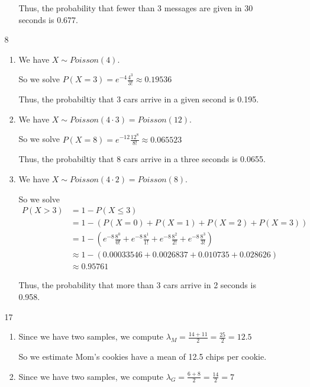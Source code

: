 \documentclass[12pt,letterpaper]{article}
\begin{document}
\begin{enumerate}
\begin{enumerate}
\begin{enumerate}[label=(\arabic*)]
              Thus, the probability that fewer than 3 messages are given in 30 seconds is 0.677.
          \end{enumerate}
        \item [8]
          \begin{enumerate}[label=(\arabic*)]
            \item
              We have $X \sim Poisson(4)$.

              So we solve $P(X = 3) = e^{-4}\frac{4^3}{3!} \approx 0.19536$

              Thus, the probabiltiy that 3 cars arrive in a given second is 0.195.
            \item
              We have $X \sim Poisson(4 \cdot 3) = Poisson(12)$.

              So we solve $P(X = 8) = e^{-12}\frac{12^8}{8!} \approx 0.065523$

              Thus, the probabiltiy that 8 cars arrive in a three seconds is 0.0655.
            \item
              We have $X \sim Poisson(4 \cdot 2) = Poisson(8)$.

              So we solve
              \begin{align*}
                P(X > 3) &= 1 - P(X \le 3) \\
                &= 1 - \left( P(X = 0) + P(X = 1) + P(X = 2) + P(X = 3) \right) \\
                &= 1 - \left( e^{-8}\frac{8^0}{0!} + e^{-8}\frac{8^1}{1!} + e^{-8}\frac{8^2}{2!} + e^{-8}\frac{8^3}{3!} \right) \\
                &\approx 1 - \left( 0.00033546 + 0.0026837 + 0.010735 + 0.028626 \right) \\
                &\approx 0.95761
              \end{align*}

              Thus, the probability that more than 3 cars arrive in 2 seconds is 0.958.
          \end{enumerate}
        \item [17]
          \begin{enumerate}[label=(\arabic*)]
            \item
              Since we have two samples,
              we compute $\lambda_M = \frac{14 + 11}{2} = \frac{25}{2} = 12.5$

              So we estimate Mom's cookies have a mean of 12.5 chips per cookie.
            \item
              Since we have two samples,
              we compute $\lambda_G = \frac{6 + 8}{2} = \frac{14}{2} = 7$


\end{enumerate}
\end{enumerate}
\end{enumerate}
\end{document}
